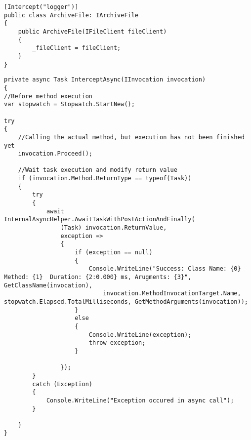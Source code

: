 \newpage
\begin{lstlisting}[language={[Sharp]C}, caption={Interceptor decorator example}, captionpos=b,label={lst:interceptor}]
[Intercept("logger")]
public class ArchiveFile: IArchiveFile
{
    public ArchiveFile(IFileClient fileClient)
    {
        _fileClient = fileClient;
    }
}
\end{lstlisting}            

\begin{lstlisting}[language={[Sharp]C}, caption={Interceptor logger logic implementation}, captionpos=b,label={lst:interceptor}]
private async Task InterceptAsync(IInvocation invocation)
{
//Before method execution
var stopwatch = Stopwatch.StartNew();

try
{
    //Calling the actual method, but execution has not been finished yet
    invocation.Proceed();

    //Wait task execution and modify return value
    if (invocation.Method.ReturnType == typeof(Task))
    {
        try
        {
            await InternalAsyncHelper.AwaitTaskWithPostActionAndFinally(
                (Task) invocation.ReturnValue,
                exception =>
                {
                    if (exception == null)
                    {
                        Console.WriteLine("Success: Class Name: {0} Method: {1}  Duration: {2:0.000} ms, Arugments: {3}", GetClassName(invocation),
                            invocation.MethodInvocationTarget.Name, stopwatch.Elapsed.TotalMilliseconds, GetMethodArguments(invocation));
                    }
                    else
                    {
                        Console.WriteLine(exception);
                        throw exception;
                    }
                    
                });
        }
        catch (Exception)
        {
            Console.WriteLine("Exception occured in async call");
        }
        
    }
}
\end{lstlisting}            
